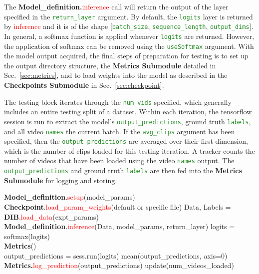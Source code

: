 \documentclass{llncs}
\begin{document}
The \textbf{Model\_definition.}\textcolor{red}{inference} call will return the output of the layer specified in the \texttt{\textcolor{ForestGreen}{return\_layer}} argument.
By default, the \texttt{\textcolor{ForestGreen}{logits}} layer is returned by \textcolor{red}{inference} and it is of the shape [\texttt{\textcolor{ForestGreen}{batch\_size}}, \texttt{\textcolor{ForestGreen}{sequence\_length}}, \texttt{\textcolor{ForestGreen}{output\_dims}}].
In general, a softmax function is applied whenever \texttt{\textcolor{ForestGreen}{logits}} are returned.
However, the application of softmax can be removed using the \texttt{\textcolor{ForestGreen}{useSoftmax}} argument.
With the model output acquired, the final steps of preparation for testing is to set up the output directory structure, the \textbf{Metrics Submodule} detailed in Sec.~\ref{sec:metrics}, and to load weights into the model as described in the \textbf{Checkpoints Submodule} in Sec.~\ref{sec:checkpoint}.

The testing block iterates through the \texttt{\textcolor{ForestGreen}{num\_vids}} specified, which generally includes an entire testing split of a dataset.
Within each iteration, the tensorflow session is run to extract the model's \texttt{\textcolor{ForestGreen}{output\_predictions}}, ground truth \texttt{\textcolor{ForestGreen}{labels}}, and all video \texttt{\textcolor{ForestGreen}{names}} the current batch.
If the \texttt{\textcolor{ForestGreen}{avg\_clips}} argument has been specified, then the \texttt{\textcolor{ForestGreen}{output\_predictions}} are averaged over their first dimension, which is the number of clips loaded for this testing iteration.
A tracker counts the number of videos that have been loaded using the video \texttt{\textcolor{ForestGreen}{names}} output.
The \texttt{\textcolor{ForestGreen}{output\_predictions}} and ground truth \texttt{\textcolor{ForestGreen}{labels}} are then fed into the \textbf{Metrics Submodule} for logging and storing.


\begin{algorithmic}[H]
\State \textbf{Model\_definition}.\textcolor{red}{setup}(model\_params)
\State \textbf{Checkpoint}.\textcolor{red}{load\_param\_weights}(default or specific file)
\State Data, Labels = \textbf{DIB}.\textcolor{red}{load\_data}(expt\_params)
\\
\State \textbf{Model\_definition}.\textcolor{red}{inference}(Data, model\_params, return\_layer)
\State logits = softmax(logits)
\EndIf
\EndFor
\\
\State \textbf{Metrics}()
\\
\State output\_predictions = sess.run(logits)
\State mean(output\_predictions, axis=0)
\EndIf
\State \textbf{Metrics.}\textcolor{red}{log\_prediction}(output\_predictions)
\State update(num\_videos\_loaded)
\EndWhile
\EndProcedure
\end{algorithmic}
\end{document}

